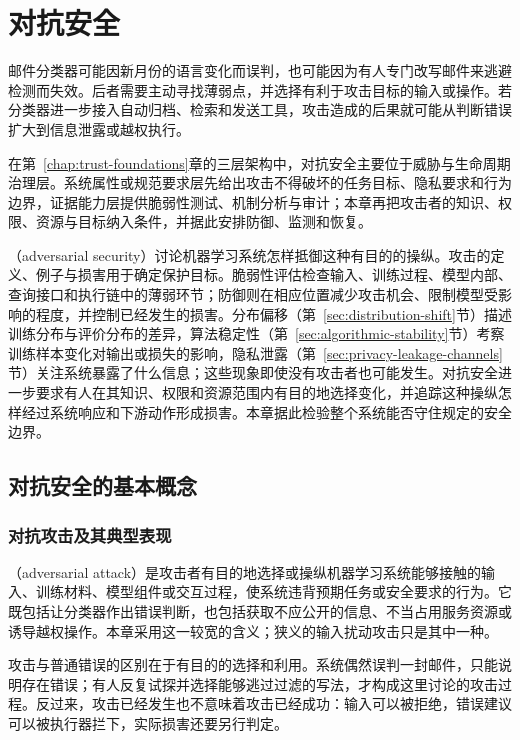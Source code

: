 \chapter{对抗安全}
\label{chap:trust-security}

邮件分类器可能因新月份的语言变化而误判，也可能因为有人专门改写邮件来逃避检测而失效。后者需要主动寻找薄弱点，并选择有利于攻击目标的输入或操作。若分类器进一步接入自动归档、检索和发送工具，攻击造成的后果就可能从判断错误扩大到信息泄露或越权执行。

在第~\ref{chap:trust-foundations}章的三层架构中，对抗安全主要位于威胁与生命周期治理层。系统属性或规范要求层先给出攻击不得破坏的任务目标、隐私要求和行为边界，证据能力层提供脆弱性测试、机制分析与审计；本章再把攻击者的知识、权限、资源与目标纳入条件，并据此安排防御、监测和恢复。

（adversarial security）讨论机器学习系统怎样抵御这种有目的的操纵。攻击的定义、例子与损害用于确定保护目标。脆弱性评估检查输入、训练过程、模型内部、查询接口和执行链中的薄弱环节；防御则在相应位置减少攻击机会、限制模型受影响的程度，并控制已经发生的损害。分布偏移（第~\ref{sec:distribution-shift}节）描述训练分布与评价分布的差异，算法稳定性（第~\ref{sec:algorithmic-stability}节）考察训练样本变化对输出或损失的影响，隐私泄露（第~\ref{sec:privacy-leakage-channels}节）关注系统暴露了什么信息；这些现象即使没有攻击者也可能发生。对抗安全进一步要求有人在其知识、权限和资源范围内有目的地选择变化，并追踪这种操纵怎样经过系统响应和下游动作形成损害。本章据此检验整个系统能否守住规定的安全边界。

\section{对抗安全的基本概念}
\label{sec:security-threats}

\subsection{对抗攻击及其典型表现}
\label{sec:security-attack-definition}

（adversarial attack）是攻击者有目的地选择或操纵机器学习系统能够接触的输入、训练材料、模型组件或交互过程，使系统违背预期任务或安全要求的行为。它既包括让分类器作出错误判断，也包括获取不应公开的信息、不当占用服务资源或诱导越权操作。本章采用这一较宽的含义；狭义的输入扰动攻击只是其中一种。

攻击与普通错误的区别在于有目的的选择和利用。系统偶然误判一封邮件，只能说明存在错误；有人反复试探并选择能够逃过过滤的写法，才构成这里讨论的攻击过程。反过来，攻击已经发生也不意味着攻击已经成功：输入可以被拒绝，错误建议可以被执行器拦下，实际损害还要另行判定。

